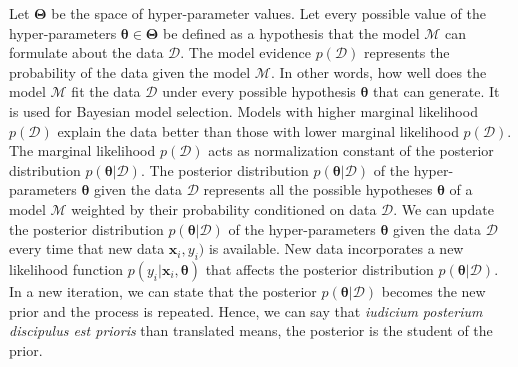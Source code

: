 Let $\boldsymbol{\Theta}$ be the space of hyper-parameter values. Let every possible value of the hyper-parameters $\boldsymbol{\theta} \in \boldsymbol{\Theta}$ be defined as a hypothesis that the model $\mathcal{M}$ can formulate about the data $\mathcal{D}$. The model evidence $p(\mathcal{D})$ represents the probability of the data given the model $\mathcal{M}$. In other words, how well does the model $\mathcal{M}$ fit the data $\mathcal{D}$ under every possible hypothesis $\boldsymbol{\theta}$ that can generate. It is used for Bayesian model selection. Models with higher marginal likelihood $p(\mathcal{D})$ explain the data better than those with lower marginal likelihood $p(\mathcal{D})$. The marginal likelihood $p(\mathcal{D})$ acts as normalization constant of the posterior distribution $p(\boldsymbol{\theta}|\mathcal{D})$. The posterior distribution $p(\boldsymbol{\theta}|\mathcal{D})$ of the hyper-parameters $\boldsymbol{\theta}$ given the data $\mathcal{D}$ represents all the possible hypotheses $\boldsymbol{\theta}$ of a model $\mathcal{M}$ weighted by their probability conditioned on data $\mathcal{D}$. We can update the posterior distribution $p(\boldsymbol{\theta}|\mathcal{D})$ of the hyper-parameters $\boldsymbol{\theta}$ given the data $\mathcal{D}$ every time that new data $\mathbf{x}_i, y_i)$ is available. New data incorporates a new likelihood function $p(y_i|\mathbf{x}_i, \boldsymbol{\theta})$ that affects the posterior distribution $p(\boldsymbol{\theta}|\mathcal{D})$. In a new iteration, we can state that the posterior $p(\boldsymbol{\theta}|\mathcal{D})$ becomes the new prior and the process is repeated. Hence, we can say that \textit{iudicium posterium discipulus est prioris} than translated means, the posterior is the student of the prior.

